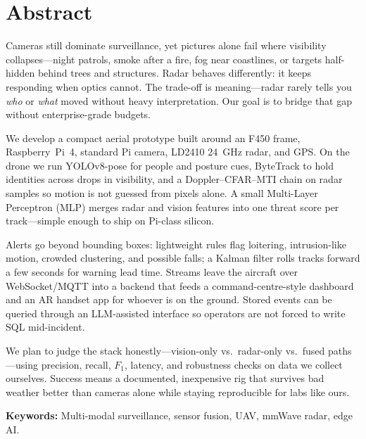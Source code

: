\chapter{Abstract}
\onehalfspacing

Cameras still dominate surveillance, yet pictures alone fail where visibility collapses---night patrols, smoke after a fire, fog near coastlines, or targets half-hidden behind trees and structures. Radar behaves differently: it keeps responding when optics cannot. The trade-off is meaning---radar rarely tells you \emph{who} or \emph{what} moved without heavy interpretation. Our goal is to bridge that gap without enterprise-grade budgets.

We develop a compact aerial prototype built around an F450 frame, Raspberry~Pi~4, standard Pi camera, LD2410 24~GHz radar, and GPS. On the drone we run YOLOv8-pose for people and posture cues, ByteTrack to hold identities across drops in visibility, and a Doppler--CFAR--MTI chain on radar samples so motion is not guessed from pixels alone. A small Multi-Layer Perceptron (MLP) merges radar and vision features into one threat score per track---simple enough to ship on Pi-class silicon.

Alerts go beyond bounding boxes: lightweight rules flag loitering, intrusion-like motion, crowded clustering, and possible falls; a Kalman filter rolls tracks forward a few seconds for warning lead time. Streams leave the aircraft over WebSocket/MQTT into a backend that feeds a command-centre-style dashboard and an AR handset app for whoever is on the ground. Stored events can be queried through an LLM-assisted interface so operators are not forced to write SQL mid-incident.

We plan to judge the stack honestly---vision-only vs.\ radar-only vs.\ fused paths---using precision, recall, $F_1$, latency, and robustness checks on data we collect ourselves. Success means a documented, inexpensive rig that survives bad weather better than cameras alone while staying reproducible for labs like ours.

\textbf{Keywords:} Multi-modal surveillance, sensor fusion, UAV, mmWave radar, edge AI.
